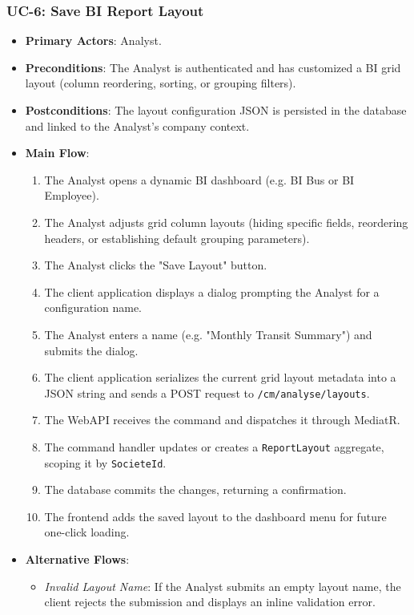 \subsubsection{UC-6: Save BI Report Layout}
\begin{itemize}
  \item \textbf{Primary Actors}: Analyst.
  \item \textbf{Preconditions}: The Analyst is authenticated and has customized a BI grid layout (column reordering, sorting, or grouping filters).
  \item \textbf{Postconditions}: The layout configuration JSON is persisted in the database and linked to the Analyst's company context.
  \item \textbf{Main Flow}:
  \begin{enumerate}
    \item The Analyst opens a dynamic BI dashboard (e.g. BI Bus or BI Employee).
    \item The Analyst adjusts grid column layouts (hiding specific fields, reordering headers, or establishing default grouping parameters).
    \item The Analyst clicks the "Save Layout" button.
    \item The client application displays a dialog prompting the Analyst for a configuration name.
    \item The Analyst enters a name (e.g. "Monthly Transit Summary") and submits the dialog.
    \item The client application serializes the current grid layout metadata into a JSON string and sends a POST request to \texttt{/cm/analyse/layouts}.
    \item The WebAPI receives the command and dispatches it through MediatR.
    \item The command handler updates or creates a \texttt{ReportLayout} aggregate, scoping it by \texttt{SocieteId}.
    \item The database commits the changes, returning a confirmation.
    \item The frontend adds the saved layout to the dashboard menu for future one-click loading.
  \end{enumerate}
  \item \textbf{Alternative Flows}:
  \begin{itemize}
    \item \emph{Invalid Layout Name}: If the Analyst submits an empty layout name, the client rejects the submission and displays an inline validation error.
  \end{itemize}
\end{itemize}

